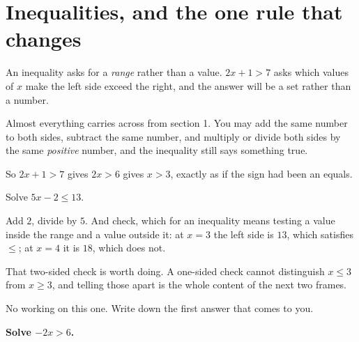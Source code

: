 
\section{Inequalities, and the one rule that changes}
\label{sec:F06-inequalities}

\begin{fr}
An inequality asks for a \emph{range} rather than a value. $2x + 1 > 7$ asks
which values of $x$ make the left side exceed the right, and the answer will
be a set rather than a number.

Almost everything carries across from section 1. You may add the same number
to both sides, subtract the same number, and multiply or divide both sides by
the same \emph{positive} number, and the inequality still says something true.

So $2x + 1 > 7$ gives $2x > 6$ gives $x > 3$, exactly as if the sign had been
an equals.

Solve $5x - 2 \le 13$.
\nextframe
\end{fr}

\begin{fr}
Add $2$, divide by $5$. And check, which for an inequality means testing a
value inside the range and a value outside it: at $x = 3$ the left side is
$13$, which satisfies $\le$; at $x = 4$ it is $18$, which does not.

That two-sided check is worth doing. A one-sided check cannot distinguish
$x \le 3$ from $x \ge 3$, and telling those apart is the whole content of the
next two frames.

No working on this one. Write down the first answer that comes to you.

\textbf{Solve $-2x > 6$.}
\dotline
\nextframe
\end{fr}

